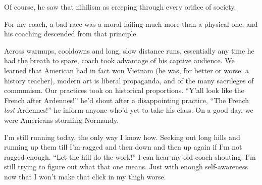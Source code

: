 \documentclass[14pt, oneside]{memoir}
\begin{document}
Of course, he saw that nihilism as creeping through every orifice of
society.



For my coach, a bad race was a moral failing much more than a physical
one, and his coaching descended from that principle.

Across warmups, cooldowns and long, slow distance runs, essentially
any time he had the breath to spare, coach took advantage of his
captive audience.
We learned that American had in fact won Vietnam (he was, for better
or worse, a history teacher), modern art is liberal propaganda, and
of the many sacrileges of communism.
Our practices took on historical proportions.
``Y'all look like the French after Ardennes!'' he'd shout after a
disappointing practice, ``The French \textit{lost} Ardennes!''
he inform anyone who'd yet to take his class.
On a good day, we were Americans storming Normandy.

I'm still running today, the only way I know how.
Seeking out long hills and running up them till I'm ragged and then
down and then up again if I'm not ragged enough.
``Let the hill do the work!'' I can hear my old coach shouting.
I'm still trying to figure out what that one means.
Just with enough self-awareness now that I won't make that click in my
thigh worse.
\end{document}
